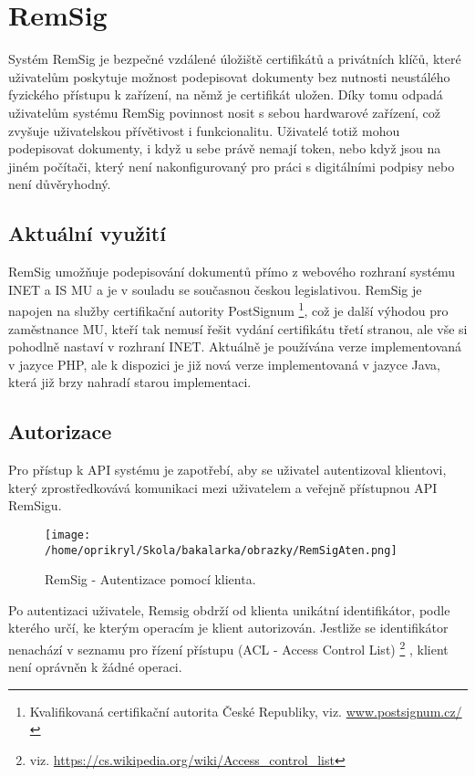 \documentclass[]{fithesis3}
\begin{document}
\chapter{RemSig}

Systém RemSig je bezpečné vzdálené úložiště certifikátů a privátních klíčů, které uživatelům poskytuje možnost podepisovat dokumenty bez nutnosti neustálého fyzického přístupu k zařízení, na němž je certifikát uložen. Díky tomu odpadá uživatelům systému RemSig povinnost nosit s sebou hardwarové zařízení, což zvyšuje uživatelskou přívětivost i funkcionalitu. Uživatelé totiž mohou podepisovat dokumenty, i když u sebe právě nemají token, nebo když jsou na jiném počítači, který není nakonfigurovaný pro práci s digitálními podpisy nebo není důvěryhodný.

	\section{Aktuální využití}

		RemSig umožňuje podepisování dokumentů přímo z webového rozhraní systému INET
		a IS MU a je v souladu se současnou českou legislativou. RemSig je napojen na služby 				certifikační autority PostSignum
	\footnote{Kvalifikovaná certifikační autorita České Republiky, viz. \url{www.postsignum.cz/}}, 			což je další výhodou pro zaměstnance MU, kteří tak nemusí řešit vydání certifikátu třetí 			stranou, ale vše si pohodlně nastaví v rozhraní INET. Aktuálně je používána verze 					implementovaná v jazyce PHP, ale k dispozici je již nová verze implementovaná v jazyce 			Java, která již brzy nahradí starou implementaci. 
	
	\section{Autorizace} 

	Pro přístup k API systému je zapotřebí, aby se uživatel autentizoval klientovi, který 				zprostředkovává komunikaci mezi uživatelem a veřejně přístupnou API RemSigu.  
	\begin{figure}[!h]
  	\begin{minipage}{1.00\textwidth}
    		\texttt{[image: /home/oprikryl/Skola/bakalarka/obrazky/RemSigAten.png]}
  	\end{minipage}
 	\caption{RemSig - Autentizace pomocí klienta.}
  	\label{fig:RemSig - Autentizace pomocí klienta.}
	\end{figure}
	Po autentizaci uživatele, Remsig obdrží od klienta unikátní identifikátor, podle kterého určí, ke 		kterým operacím je klient autorizován. Jestliže se identifikátor nenachází v seznamu pro řízení 		přístupu (ACL - Access Control List)
	\footnote{viz. \url{https://cs.wikipedia.org/wiki/Access_control_list}} , klient není oprávněn k 		žádné operaci.
\end{document}
